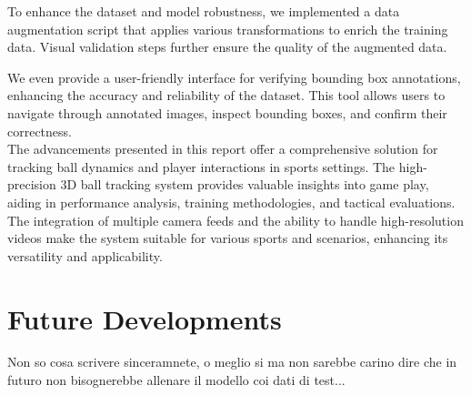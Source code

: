 \documentclass{template}
\begin{document}
To enhance the dataset and model robustness, we implemented a data augmentation script that applies various transformations to enrich the training data. 
Visual validation steps further ensure the quality of the augmented data.

We even provide a user-friendly interface for verifying bounding box annotations, enhancing the accuracy and reliability of the dataset. 
This tool allows users to navigate through annotated images, inspect bounding boxes, and confirm their correctness.
\\
The advancements presented in this report offer a comprehensive solution for tracking ball dynamics and player interactions in sports settings. 
The high-precision 3D ball tracking system provides valuable insights into game play, aiding in performance analysis, training methodologies, and tactical evaluations. 
The integration of multiple camera feeds and the ability to handle high-resolution videos make the system suitable for various sports and scenarios, enhancing its versatility and applicability.

\section{Future Developments}
Non so cosa scrivere sinceramnete, o meglio si ma non sarebbe carino dire che in futuro non bisognerebbe allenare il modello coi dati di test...
\end{document}
